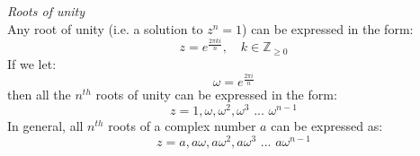 \documentclass{scrartcl}
\newcommand{\Z}{\mathbb{Z}}
\begin{document}
\\\\
\textit{Roots of unity}
\\
Any root of unity (i.e. a solution to $ z^{n} = 1 $) can be expressed in the form:
\begin{equation}
z = e^{\frac{2 \pi k i}{n}}, \quad k \in \Z_{\geq 0}
\end{equation}
If we let:
\begin{equation}
\omega = e^{\frac{2 \pi i}{n}}
\end{equation}
then all the $ n^{th} $ roots of unity can be expressed in the form:
\begin{equation}
z = 1, \omega, \omega^{2}, \omega^{3} \textrm{ ... } \omega^{n-1}
\end{equation}
In general, all $ n^{th} $ roots of a complex number $ a $ can be expressed as:
\begin{equation}
z = a, a\omega, a\omega^{2}, a\omega^{3} \textrm{ ... } a\omega^{n-1}
\end{equation}
\end{document}
